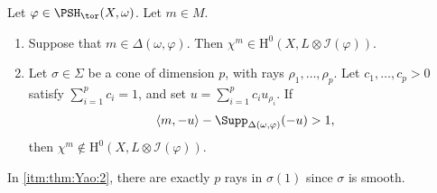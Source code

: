 \begin{theorem}[Yao]\label{thm:Yao}
    Let $\varphi\in \PSH_{\tor}(X,\omega)$. Let $m\in M$.
    \begin{enumerate}
        \item\label{itm:thm:Yao:1} Suppose that $m\in \Delta(\omega,\varphi)$. Then $\chi^m\in \mathrm{H}^0(X,L\otimes \mathcal{I}(\varphi))$.
        \item\label{itm:thm:Yao:2} Let $\sigma\in \Sigma$ be a cone of dimension $p$, with rays $\rho_1,\ldots,\rho_p$. Let $c_1,\ldots,c_p>0$ satisfy $\sum_{i=1}^p c_i=1$, and set $u=\sum_{i=1}^p c_i u_{\rho_i}$. If
        \begin{equation}\label{eq:mawayC1}
            \langle m,-u\rangle -\Supp_{\Delta(\omega,\varphi)}(-u)>1,
        \end{equation}
        then $\chi^m\not\in \mathrm{H}^0(X,L\otimes \mathcal{I}(\varphi))$.
    \end{enumerate}
\end{theorem}
In \ref{itm:thm:Yao:2}, there are exactly $p$ rays in $\sigma(1)$ since $\sigma$ is smooth.
